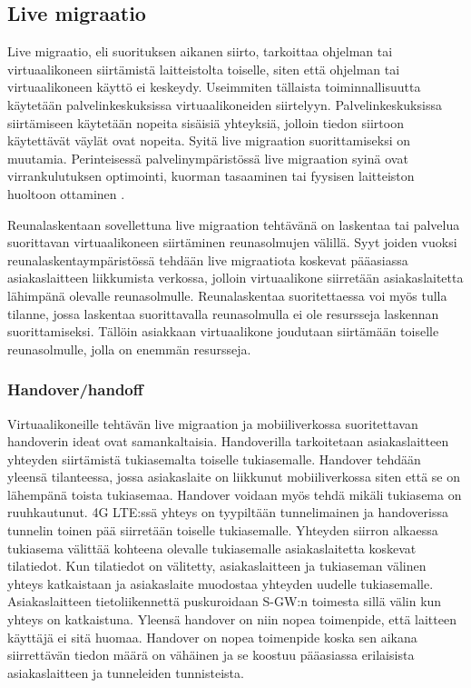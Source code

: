 \subsection{Live migraatio}
Live migraatio, eli suorituksen aikanen siirto, tarkoittaa ohjelman tai virtuaalikoneen siirtämistä laitteistolta toiselle, siten että ohjelman tai virtuaalikoneen käyttö ei keskeydy. 
Useimmiten tällaista toiminnallisuutta käytetään palvelinkeskuksissa virtuaalikoneiden
siirtelyyn. Palvelinkeskuksissa siirtämiseen käytetään nopeita sisäisiä yhteyksiä,
jolloin tiedon siirtoon käytettävät väylät ovat nopeita. Syitä live migraation
suorittamiseksi on muutamia. Perinteisessä palvelinympäristössä live migraation
syinä ovat virrankulutuksen optimointi, kuorman tasaaminen tai fyysisen
laitteiston huoltoon ottaminen \cite{soni2013comparative}. 

Reunalaskentaan sovellettuna live migraation tehtävänä on laskentaa tai palvelua suorittavan virtuaalikoneen siirtäminen reunasolmujen välillä.
Syyt joiden vuoksi reunalaskentaympäristössä tehdään live migraatiota koskevat pääasiassa asiakaslaitteen liikkumista verkossa, jolloin virtuaalikone siirretään asiakaslaitetta lähimpänä olevalle  reunasolmulle. 
Reunalaskentaa suoritettaessa voi myös tulla tilanne, jossa laskentaa suorittavalla reunasolmulla ei ole resursseja laskennan suorittamiseksi. Tällöin asiakkaan virtuaalikone joudutaan siirtämään toiselle reunasolmulle, jolla on enemmän resursseja.  


\subsubsection*{Handover/handoff}%
Virtuaalikoneille tehtävän live migraation ja mobiiliverkossa suoritettavan handoverin ideat ovat samankaltaisia.
Handoverilla tarkoitetaan asiakaslaitteen yhteyden siirtämistä tukiasemalta toiselle tukiasemalle. 
Handover tehdään yleensä tilanteessa, jossa asiakaslaite on liikkunut mobiiliverkossa siten että se on lähempänä toista tukiasemaa. Handover voidaan myös tehdä mikäli tukiasema on ruuhkautunut. \cite{lähde}
4G LTE:ssä yhteys on tyypiltään tunnelimainen ja handoverissa tunnelin toinen pää siirretään toiselle tukiasemalle.
Yhteyden siirron alkaessa tukiasema välittää kohteena olevalle tukiasemalle asiakaslaitetta koskevat tilatiedot. Kun tilatiedot on välitetty, asiakaslaitteen ja tukiaseman välinen yhteys katkaistaan ja asiakaslaite muodostaa yhteyden uudelle tukiasemalle.
Asiakaslaitteen tietoliikennettä puskuroidaan S-GW:n toimesta sillä välin kun yhteys on katkaistuna. Yleensä handover on niin nopea toimenpide, että laitteen käyttäjä ei sitä huomaa.
Handover on nopea toimenpide koska sen aikana siirrettävän tiedon määrä on vähäinen ja se koostuu pääasiassa erilaisista asiakaslaitteen ja tunneleiden tunnisteista.

